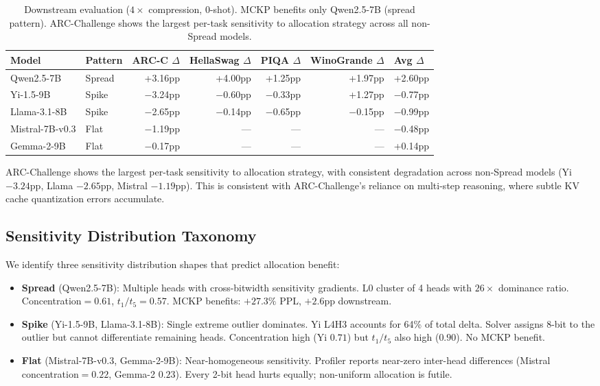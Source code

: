 \documentclass[11pt,a4paper]{article}
\begin{document}
\begin{table}[h]
\centering
\caption{Downstream evaluation ($4\times$ compression, 0-shot). MCKP benefits only Qwen2.5-7B (spread pattern). ARC-Challenge shows the largest per-task sensitivity to allocation strategy across all non-Spread models.}
\label{tab:downstream}
\begin{tabular}{@{}llrrrrl@{}}
\toprule
Model & Pattern & ARC-C $\Delta$ & HellaSwag $\Delta$ & PIQA $\Delta$ & WinoGrande $\Delta$ & Avg $\Delta$ \\
\midrule
Qwen2.5-7B & Spread & +3.16pp & +4.00pp & +1.25pp & +1.97pp & +2.60pp \\
Yi-1.5-9B & Spike & $-$3.24pp & $-$0.60pp & $-$0.33pp & +1.27pp & $-$0.77pp \\
Llama-3.1-8B & Spike & $-$2.65pp & $-$0.14pp & $-$0.65pp & $-$0.15pp & $-$0.99pp \\
Mistral-7B-v0.3 & Flat & $-$1.19pp & --- & --- & --- & $-$0.48pp \\
Gemma-2-9B & Flat & $-$0.17pp & --- & --- & --- & +0.14pp \\
\bottomrule
\end{tabular}
\end{table}

ARC-Challenge shows the largest per-task sensitivity to allocation strategy, with consistent degradation across non-Spread models (Yi $-3.24$pp, Llama $-2.65$pp, Mistral $-1.19$pp).
This is consistent with ARC-Challenge's reliance on multi-step reasoning, where subtle KV cache quantization errors accumulate.

\subsection{Sensitivity Distribution Taxonomy}

We identify three sensitivity distribution shapes that predict allocation benefit:

\begin{itemize}[leftmargin=*,itemsep=2pt]
\item \textbf{Spread} (Qwen2.5-7B): Multiple heads with cross-bitwidth sensitivity gradients. L0 cluster of 4 heads with $26\times$ dominance ratio. Concentration$=0.61$, $t_1/t_5=0.57$. MCKP benefits: $+27.3\%$ PPL, $+2.6$pp downstream.

\item \textbf{Spike} (Yi-1.5-9B, Llama-3.1-8B): Single extreme outlier dominates. Yi L4H3 accounts for 64\% of total delta. Solver assigns 8-bit to the outlier but cannot differentiate remaining heads. Concentration high (Yi $0.71$) but $t_1/t_5$ also high ($0.90$). No MCKP benefit.

\item \textbf{Flat} (Mistral-7B-v0.3, Gemma-2-9B): Near-homogeneous sensitivity. Profiler reports near-zero inter-head differences (Mistral concentration$=0.22$, Gemma-2 $0.23$). Every 2-bit head hurts equally; non-uniform allocation is futile.
\end{itemize}
\end{document}
